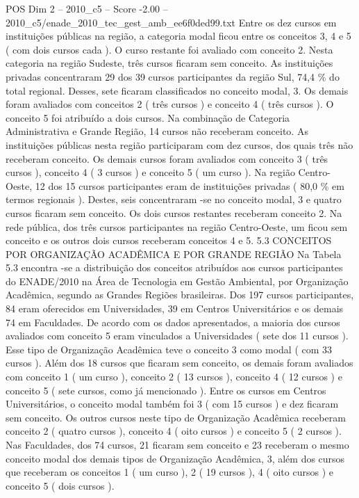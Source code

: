 \begin{textsample}{POS Dim 2 – 2010\_c5 – Score -2.00 – 2010\_c5/enade\_2010\_tec\_gest\_amb\_ee6f0ded99.txt}
Entre os dez cursos em instituições públicas na região, a categoria modal ficou entre os conceitos 3, 4 e 5 ( com dois cursos cada ).
O curso restante foi avaliado com conceito 2.
Nesta categoria na região Sudeste, três cursos ficaram sem conceito.
As instituições privadas concentraram 29 dos 39 cursos participantes da região Sul, 74,4 \% do total regional.
Desses, sete ficaram classificados no conceito modal, 3.
Os demais foram avaliados com conceitos 2 ( três cursos ) e conceito 4 ( três cursos ).
O conceito 5 foi atribuído a dois cursos.
Na combinação de Categoria Administrativa e Grande Região, 14 cursos não receberam conceito.
As instituições públicas nesta região participaram com dez cursos, dos quais três não receberam conceito.
Os demais cursos foram avaliados com conceito 3 ( três cursos ), conceito 4 ( 3 cursos ) e conceito 5 ( um curso ).
Na região Centro-Oeste, 12 dos 15 cursos participantes eram de instituições privadas ( 80,0 \% em termos regionais ).
Destes, seis concentraram -se no conceito modal, 3 e quatro cursos ficaram sem conceito.
Os dois cursos restantes receberam conceito 2.
Na rede pública, dos três cursos participantes na região Centro-Oeste, um ficou sem conceito e os outros dois cursos receberam conceitos 4 e 5. 5.3 CONCEITOS POR ORGANIZAÇÃO ACADÊMICA E POR GRANDE REGIÃO Na Tabela 5.3 encontra -se a distribuição dos conceitos atribuídos aos cursos participantes do ENADE/2010 na Área de Tecnologia em Gestão Ambiental, por Organização Acadêmica, segundo as Grandes Regiões brasileiras.
Dos 197 cursos participantes, 84 eram oferecidos em Universidades, 39 em Centros Universitários e os demais 74 em Faculdades.
De acordo com os dados apresentados, a maioria dos cursos avaliados com conceito 5 eram vinculados a Universidades ( sete dos 11 cursos ).
Esse tipo de Organização Acadêmica teve o conceito 3 como modal ( com 33 cursos ).
Além dos 18 cursos que ficaram sem conceito, os demais foram avaliados com conceito 1 ( um curso ), conceito 2 ( 13 cursos ), conceito 4 ( 12 cursos ) e conceito 5 ( sete cursos, como já mencionado ).
Entre os cursos em Centros Universitários, o conceito modal também foi 3 ( com 15 cursos ) e dez ficaram sem conceito.
Os outros cursos neste tipo de Organização Acadêmica receberam conceito 2 ( quatro cursos ), conceito 4 ( oito cursos ) e conceito 5 ( 2 cursos ).
Nas Faculdades, dos 74 cursos, 21 ficaram sem conceito e 23 receberam o mesmo conceito modal dos demais tipos de Organização Acadêmica, 3, além dos cursos que receberam os conceitos 1 ( um curso ), 2 ( 19 cursos ), 4 ( oito cursos ) e conceito 5 ( dois cursos ).

\end{textsample}
